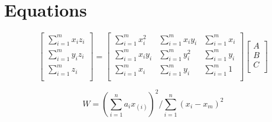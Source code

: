 \documentclass[journal,onecolumn]{IEEEtran}
\begin{document}
{%
%


\appendices
\section{Equations}

\begin{equation}\label{eqn:MLS}
	\left[ {\begin{array}{cc}
			\sum_{i=1}^{m} x_i z_i \\
			\sum_{i=1}^{m} y_i z_i \\
			\sum_{i=1}^{m} z_i \\
			
	\end{array} } \right]
	=
	\left[ {\begin{array}{ccc}
			\sum_{i=1}^{m} x_i^2 		& \sum_{i=1}^{m} x_i y_i 		& \sum_{i=1}^{m} x_i \\
			\sum_{i=1}^{m} x_i y_i 		& \sum_{i=1}^{m} y_i^2 			& \sum_{i=1}^{m} y_i \\
			\sum_{i=1}^{m} x_i 			& \sum_{i=1}^{m} y_i 			& \sum_{i=1}^{m} 1   \\
	\end{array} } \right]
	\left[ {\begin{array}{cc}
			A\\
			B\\
			C\\
	\end{array} } \right]
\end{equation}





\begin{equation}
	W = (\sum_{i=1}^{n} a_i x_{(i)})^2 / \sum_{i=1}^{n}(x_i - x_m)^2
	\label{eq:shapiro_wilks}
\end{equation}

}
\end{document}
